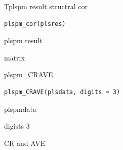 \documentclass[a4paper]{book}
\begin{document}
%
\begin{Description}
Tplspm result structral cor
\end{Description}
%
\begin{Usage}
\begin{verbatim}
plspm_cor(plsres)
\end{verbatim}
\end{Usage}
%
\begin{Arguments}
\begin{ldescription}
\item[\code{plsres}] plspm result
\end{ldescription}
\end{Arguments}
%
\begin{Value}
matrix
\end{Value}
%
\begin{Description}
plspm\_CRAVE
\end{Description}
%
\begin{Usage}
\begin{verbatim}
plspm_CRAVE(plsdata, digits = 3)
\end{verbatim}
\end{Usage}
%
\begin{Arguments}
\begin{ldescription}
\item[\code{plsdata}] plspmdata

\item[\code{digits}] digists 3
\end{ldescription}
\end{Arguments}
%
\begin{Value}
CR and AVE
\end{Value}
%
\end{document}

